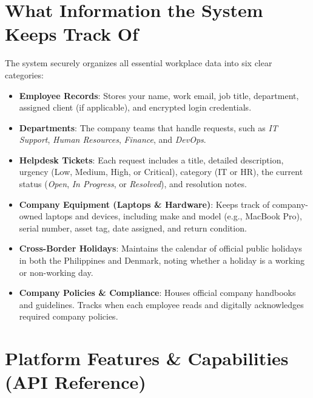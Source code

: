 \documentclass[a4paper,11pt]{article}
\begin{document}
\section{What Information the System Keeps Track Of}

The system securely organizes all essential workplace data into six clear categories:

\begin{itemize}
    \item \textbf{Employee Records}:
    Stores your name, work email, job title, department, assigned client (if applicable), and encrypted login credentials.
    
    \item \textbf{Departments}:
    The company teams that handle requests, such as \textit{IT Support}, \textit{Human Resources}, \textit{Finance}, and \textit{DevOps}.
    
    \item \textbf{Helpdesk Tickets}:
    Each request includes a title, detailed description, urgency (Low, Medium, High, or Critical), category (IT or HR), the current status (\textit{Open}, \textit{In Progress}, or \textit{Resolved}), and resolution notes.
    
    \item \textbf{Company Equipment (Laptops \& Hardware)}:
    Keeps track of company-owned laptops and devices, including make and model (e.g., MacBook Pro), serial number, asset tag, date assigned, and return condition.
    
    \item \textbf{Cross-Border Holidays}:
    Maintains the calendar of official public holidays in both the Philippines and Denmark, noting whether a holiday is a working or non-working day.
    
    \item \textbf{Company Policies \& Compliance}:
    Houses official company handbooks and guidelines. Tracks when each employee reads and digitally acknowledges required company policies.
\end{itemize}

\section{Platform Features \& Capabilities (API Reference)}
\end{document}
